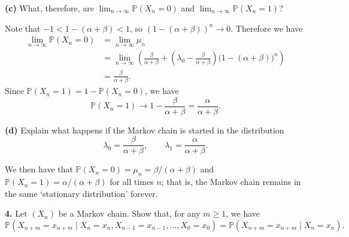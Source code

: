 \documentclass[
  a4paper,
]{article}
\theoremstyle{definition}
\theoremstyle{definition}
\theoremstyle{definition}
\theoremstyle{remark}
\begin{document}
\textbf{(c)} What, therefore, are \(\lim_{n\to\infty} \mathbb P(X_n = 0)\) and \(\lim_{n\to\infty} \mathbb P(X_n = 1)\)?

\begin{myanswers}

Note that \(-1 < 1 - (\alpha + \beta) < 1\), so \((1-(\alpha+\beta))^n \to 0\). Therefore we have
\begin{align*}
\lim_{n\to\infty} \mathbb P(X_n = 0) &= \lim_{n\to\infty} \mu_n \\
&= \lim_{n\to\infty} \left( \frac{\beta}{\alpha+\beta} + \left(\lambda_0 - \frac{\beta}{\alpha+\beta}\right)\big(1-(\alpha+\beta)\big)^n \right) \\
&= \frac{\beta}{\alpha+\beta} .
\end{align*}
Since \(\mathbb P(X_n = 1) = 1- \mathbb P(X_n = 0)\), we have
\[ \mathbb P(X_n = 1) \to 1 - \frac{\beta}{\alpha+\beta} = \frac{\alpha}{\alpha+\beta} . \]

\end{myanswers}

\textbf{(d)} Explain what happens if the Markov chain is started in the distribution
\[ \lambda_0 = \frac{\beta}{\alpha+\beta} , \qquad \lambda_1 = \frac{\alpha}{\alpha+\beta}  . \]

\begin{myanswers}

We then have that \(\mathbb P(X_n = 0) = \mu_n = \beta/(\alpha+\beta)\) and \(\mathbb P(X_n = 1) = \alpha/(\alpha+\beta)\) for all times \(n\); that is, the Markov chain remains in the same `stationary distribution' forever.

\end{myanswers}

\textbf{4.} Let \((X_n)\) be a Markov chain. Show that, for any \(m \geq 1\), we have
\[ \mathbb P(X_{n+m} = x_{n+m} \mid X_n = x_n, X_{n-1} = x_{n-1}, \dots, X_0 = x_0)  =  \mathbb P(X_{n+m} = x_{n+m} \mid X_n = x_n) . \]
\end{document}
